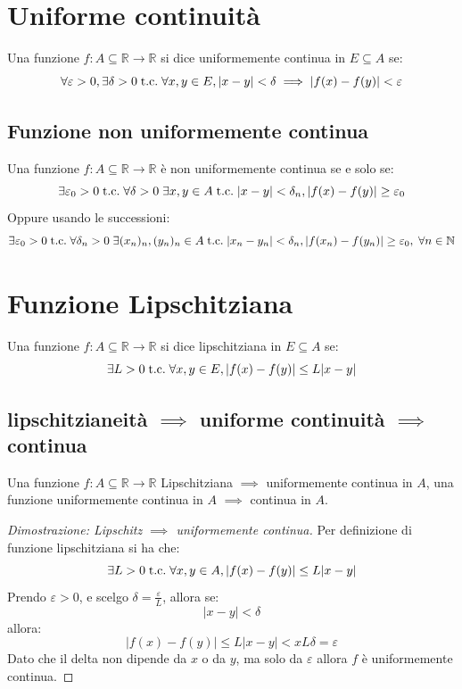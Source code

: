 \documentclass[a4paper,12pt,openright]{book}
\begin{document}
    \section{Uniforme continuità}
    Una funzione $f: A \subseteq \mathbb{R} \longrightarrow \mathbb{R}$ si dice uniformemente continua in $E \subseteq A$ se:
    \[\forall \varepsilon > 0, \exists \delta > 0 \;\text{t.c.}\; \forall x,y \in E, |x - y| < \delta \implies |f(x) - f(y)| < \varepsilon\]
    
    \subsection{Funzione non uniformemente continua}
    Una funzione $f: A \subseteq \mathbb{R} \longrightarrow \mathbb{R}$ è non uniformemente continua se e solo se: 
    \[\exists \varepsilon_0 > 0 \;\text{t.c.}\; \forall \delta > 0 \; \exists x, y \in A \;\text{t.c.}\; |x - y| < \delta_n, |f(x) - f(y)| \geq \varepsilon_0\]
    Oppure usando le successioni:
    \[\exists \varepsilon_0 > 0 \;\text{t.c.}\; \forall \delta_n > 0 \; \exists (x_n)_n, (y_n)_n \in A \;\text{t.c.}\; |x_n - y_n| < \delta_n, |f(x_n) - f(y_n)| \geq \varepsilon_0, \; \forall n \in \mathbb{N}\]
    
    \section{Funzione Lipschitziana}
    Una funzione $f: A \subseteq \mathbb{R} \longrightarrow \mathbb{R}$ si dice lipschitziana in $E \subseteq A$ se:
    \[\exists L > 0 \;\text{t.c.}\; \forall x, y \in E, |f(x) - f(y)| \leq L|x - y|\]
    
    \subsection{lipschitzianeità $\implies$ uniforme continuità $\implies$ continua}
    Una funzione $f: A \subseteq \mathbb{R} \longrightarrow \mathbb{R}$ Lipschitziana $\implies$ uniformemente continua in $A$, una funzione uniformemente continua in $A$ $\implies$ continua in $A$.
    
    \begin{proof}[Dimostrazione: Lipschitz $\implies$ uniformemente continua]
    	Per definizione di funzione lipschitziana si ha che:
    	\[\exists L > 0 \;\text{t.c.}\; \forall x, y \in A ,  |f(x) - f(y)| \leq L|x - y|\]
    	Prendo $\varepsilon > 0$, e scelgo $\delta = \frac{\varepsilon}{L}$, allora se:
    	\[|x - y| < \delta\]
    	allora:
    	\[|f(x) - f(y)| \leq L|x - y| <x L\delta = \varepsilon\]
    	Dato che il delta non dipende da $x$ o da $y$, ma solo da $\varepsilon$ allora $f$ è uniformemente continua. 
    \end{proof}
    
\end{document}

